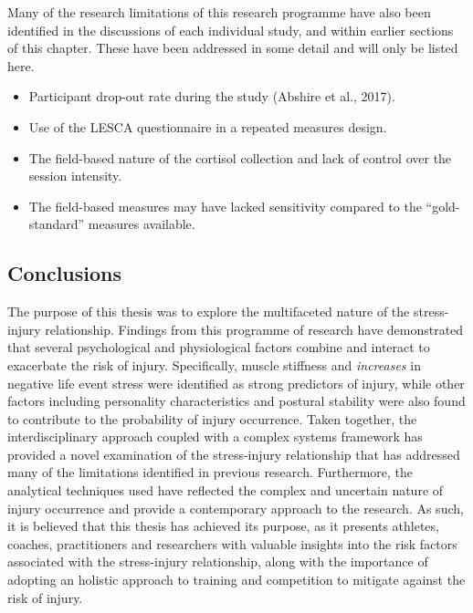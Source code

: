 \documentclass[
  english,
  man,floatsintext]{apa6}
\begin{document}
Many of the research limitations of this research programme have also been identified in the discussions of each individual study, and within earlier sections of this chapter.
These have been addressed in some detail and will only be listed here.

\begin{itemize}
\item
  Participant drop-out rate during the study (Abshire et al., 2017).
\item
  Use of the LESCA questionnaire in a repeated measures design.
\item
  The field-based nature of the cortisol collection and lack of control over the session intensity.
\item
  The field-based measures may have lacked sensitivity compared to the \enquote{gold-standard} measures available.
\end{itemize}

\hypertarget{conclusions}{%
\subsection{Conclusions}\label{conclusions}}

The purpose of this thesis was to explore the multifaceted nature of the stress-injury relationship.
Findings from this programme of research have demonstrated that several psychological and physiological factors combine and interact to exacerbate the risk of injury.
Specifically, muscle stiffness and \emph{increases} in negative life event stress were identified as strong predictors of injury, while other factors including personality characteristics and postural stability were also found to contribute to the probability of injury occurrence.
Taken together, the interdisciplinary approach coupled with a complex systems framework has provided a novel examination of the stress-injury relationship that has addressed many of the limitations identified in previous research.
Furthermore, the analytical techniques used have reflected the complex and uncertain nature of injury occurrence and provide a contemporary approach to the research.
As such, it is believed that this thesis has achieved its purpose, as it presents athletes, coaches, practitioners and researchers with valuable insights into the risk factors associated with the stress-injury relationship, along with the importance of adopting an holistic approach to training and competition to mitigate against the risk of injury.

\clearpage
\end{document}
